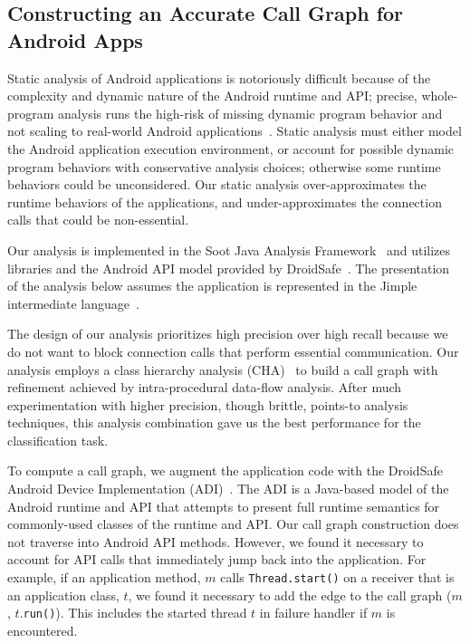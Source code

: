 
\subsection{Constructing an Accurate Call Graph for Android Apps }

Static analysis of Android applications is notoriously difficult
because of the complexity and dynamic nature of the Android runtime
and API; precise, whole-program analysis runs the high-risk of missing
dynamic program behavior and not scaling to real-world Android
applications~\cite{Gordon:Kim:Perkins:Gilham:Nguyen:Rinard:NDSS15}.
Static analysis must either model the Android application execution
environment, or account for possible dynamic program behaviors with
conservative analysis choices; otherwise some runtime behaviors could
be unconsidered.  Our static analysis over-approximates the runtime
behaviors of the applications, and under-approximates the connection
calls that could be non-essential.
 
Our analysis is implemented in the Soot Java
Analysis Framework~\cite{Vallee-Rai2000} and utilizes libraries and
the Android API model provided by
DroidSafe~\cite{Gordon:Kim:Perkins:Gilham:Nguyen:Rinard:NDSS15}. The
presentation of the analysis below assumes the application is
represented in the Jimple intermediate language~\cite{Vallee-Rai2000}.

The design of our analysis prioritizes high precision over high recall
because we do not want to block connection calls that perform
essential communication. Our analysis employs a class hierarchy
analysis (CHA)~\cite{Dean1995} to build a call graph with refinement
achieved by intra-procedural data-flow analysis.  After much
experimentation with higher precision, though brittle, points-to
analysis techniques, this analysis combination gave us the best
performance for the classification task.
   
To compute a call graph, we augment the application code with the
DroidSafe Android Device Implementation
(ADI)~\cite{Gordon:Kim:Perkins:Gilham:Nguyen:Rinard:NDSS15}.  The ADI
is a Java-based model of the Android runtime and API that attempts to
present full runtime semantics for commonly-used classes of the
runtime and API.  Our call graph construction does not traverse into
Android API methods.  However, we found it necessary to account for
API calls that immediately jump back into the application.  For
example, if an application method, $m$ calls
\lstinline!Thread.start()! on a receiver that is an application class,
$t$, we found it necessary to add the edge to the call graph ($m$,
$t$.\lstinline!run()!).  This includes the started thread $t$ in
failure handler if $m$ is encountered.

